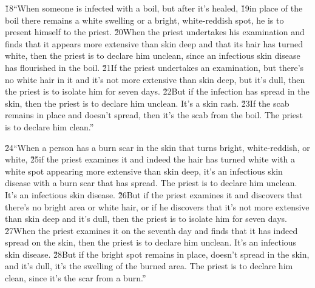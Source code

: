 \v{18}``When someone is infected with a boil, but after it's healed, \v{19}in place of the boil there remains a white swelling or a bright, white-reddish spot, he is to present himself to the priest. \v{20}When the priest undertakes his examination and finds that it appears more extensive than skin deep and that its hair has turned white, then the priest is to declare him unclean, since an infectious skin disease has flourished in the boil. \v{21}If the priest undertakes an examination, but there's no white hair in it and it's not more extensive than skin deep, but it's dull, then the priest is to isolate him for seven days. \v{22}But if the infection has spread in the skin, then the priest is to declare him unclean. It's a skin rash. \v{23}If the scab remains in place and doesn't spread, then it's the scab from the boil. The priest is to declare him clean.''

\v{24}``When a person has a burn scar in the skin that turns bright, white-reddish, or white, \v{25}if the priest examines it and indeed the hair has turned white with a white spot appearing more extensive than skin deep, it's an infectious skin disease with a burn scar that has spread. The priest is to declare him unclean. It's an infectious skin disease. \v{26}But if the priest examines it and discovers that there's no bright area or white hair, or if he discovers that it's not more extensive than skin deep and it's dull, then the priest is to isolate him for seven days. \v{27}When the priest examines it on the seventh day and finds that it has indeed spread on the skin, then the priest is to declare him unclean. It's an infectious skin disease. \v{28}But if the bright spot remains in place, doesn't spread in the skin, and it's dull, it's the swelling of the burned area. The priest is to declare him clean, since it's the scar from a burn.''

